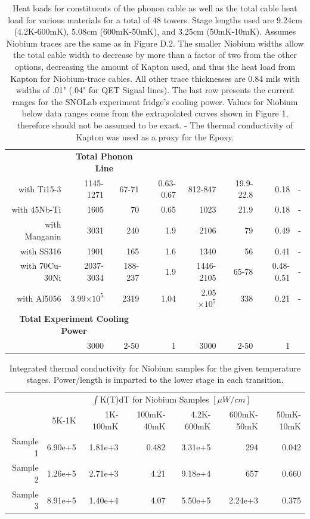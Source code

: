 \documentclass{report}
\providecommand{\e}[1]{\ensuremath{\times 10^{#1}}}
\begin{document}
\begin{appendices}
\begin{table}[h]
{\begin{threeparttable}
\begin{tabular}{rrrr|rrrr}
   & \multicolumn{2}{c}{\bf{Total Phonon Line}} & & & & & \\
   with Ti15-3 & 1145-1271 & 67-71 & 0.63-0.67 & 812-847 & 19.9-22.8 & 0.18 & - \\
   with 45Nb-Ti & 1605 & 70 & 0.65 & 1023 & 21.9 & 0.18& - \\
   with Manganin & 3031 & 240 & 1.9 & 2106 & 79 & 0.49 & -\\
   with SS316 & 1901 & 165 & 1.6 & 1340 & 56 & 0.41& -\\
   with 70Cu-30Ni & 2037-3034 & 188-237 & 1.9 & 1446-2105 & 65-78 & 0.48-0.51 & -\\
   with Al5056 & 3.99\e5 & 2319 & 1.04 & 2.05\e5 & 338 & 0.21 & - \\
\multicolumn{3}{c}{\bf{Total Experiment Cooling Power}} & & & & &\\
 & 3000 & 2-50 & 1 & 3000 & 2-50 & 1 & \\
  \bottomrule
\end{tabular}
\end{threeparttable}}
\caption{Heat loads for constituents of the phonon cable as well as the total cable heat load for various materials for a total of 48 towers. Stage lengths used are 9.24cm (4.2K-600mK), 5.08cm (600mK-50mK), and 3.25cm (50mK-10mK). Assumes Niobium traces are the same as in Figure D.2. The smaller Niobium widths allow the total cable width to decrease by more than a factor of two from the other options, decreasing the amount of Kapton used, and thus the heat load from Kapton for Niobium-trace cables. All other trace thicknesses are 0.84 mils with widths of .01" (.04" for QET Signal lines). The last row presents the current ranges for the SNOLab experiment fridge's cooling power. Values for Niobium below data ranges come from the extrapolated curves shown in Figure 1, therefore should not be assumed to be exact. \dag - The thermal conductivity of Kapton was used as a proxy for the Epoxy.}
\end{table}

\begin{table}[h]
\begin{threeparttable}
\begin{tabular}{rrrr|rrr}
\toprule
& & \multicolumn{4}{c}{$\int$K(T)dT for Niobium Samples $[\mu W/cm]$} & \\
\cmidrule(r){2-7}
& 5K-1K & 1K-100mK & 100mK-40mK & 4.2K-600mK & 600mK-50mK & 50mK-10mK \\
Sample 1 & 6.90e+5 & 1.81e+3 & 0.482 & 3.31e+5 & 294 & 0.042 \\
Sample 2 & 1.26e+5 & 2.71e+3 & 4.21 & 9.18e+4 & 657 & 0.660 \\
Sample 3 & 8.91e+5 & 1.40e+4 & 4.07 & 5.50e+5 & 2.24e+3 & 0.375 \\
\bottomrule
\end{tabular}
\end{threeparttable}
\caption{Integrated thermal conductivity for Niobium samples for the given temperature stages. Power/length is imparted to the lower stage in each transition.}
\end{table}



\end{appendices}
\end{document}
